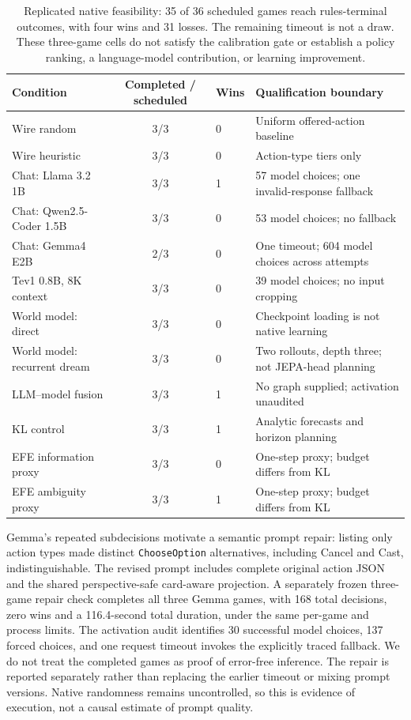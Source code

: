 \documentclass[11pt,a4paper]{article}
\theoremstyle{definition}
\theoremstyle{plain}
\begin{document}
\begin{table}[ht]
\centering
\small
\begin{tabularx}{\linewidth}{lclX}
\toprule
Condition & Completed / scheduled & Wins & Qualification boundary \\
\midrule
Wire random & 3/3 & 0 & Uniform offered-action baseline \\
Wire heuristic & 3/3 & 0 & Action-type tiers only \\
Chat: Llama 3.2 1B & 3/3 & 1 & 57 model choices; one invalid-response fallback \\
Chat: Qwen2.5-Coder 1.5B & 3/3 & 0 & 53 model choices; no fallback \\
Chat: Gemma4 E2B & 2/3 & 0 & One timeout; 604 model choices across attempts \\
Tev1 0.8B, 8K context & 3/3 & 0 & 39 model choices; no input cropping \\
World model: direct & 3/3 & 0 & Checkpoint loading is not native learning \\
World model: recurrent dream & 3/3 & 0 & Two rollouts, depth three; not JEPA-head planning \\
LLM--model fusion & 3/3 & 1 & No graph supplied; activation unaudited \\
KL control & 3/3 & 1 & Analytic forecasts and horizon planning \\
EFE information proxy & 3/3 & 0 & One-step proxy; budget differs from KL \\
EFE ambiguity proxy & 3/3 & 1 & One-step proxy; budget differs from KL \\
\bottomrule
\end{tabularx}
\caption{Replicated native feasibility: 35 of 36 scheduled games reach
rules-terminal outcomes, with four wins and 31 losses. The remaining timeout
is not a draw. These three-game cells do not satisfy the calibration gate or establish
a policy ranking, a language-model contribution, or learning improvement.}
\label{tab:native-policy-execution}
\end{table}

Gemma's repeated subdecisions motivate a semantic prompt repair: listing only
action types made distinct \texttt{ChooseOption} alternatives, including
Cancel and Cast, indistinguishable. The revised prompt includes complete
original action JSON and the shared perspective-safe card-aware projection.
A separately frozen three-game repair check completes all three Gemma
games, with 168 total decisions, zero wins and a 116.4-second total duration,
under the same per-game and process limits. The activation audit identifies
30 successful model choices, 137 forced choices, and
one request timeout invokes the explicitly traced fallback. We do not treat
the completed games as proof of error-free inference. The repair is reported
separately rather than replacing the earlier timeout or mixing prompt
versions. Native randomness remains uncontrolled, so this is evidence of
execution, not a causal estimate of prompt quality.
\end{document}
